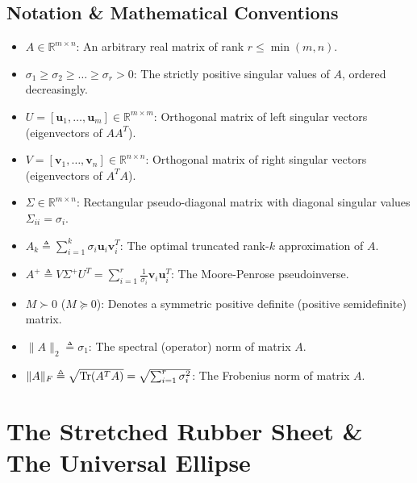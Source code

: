 \subsection{Notation \& Mathematical Conventions}
\begin{itemize}
    \item $A \in \mathbb{R}^{m \times n}$: An arbitrary real matrix of rank $r \le \min(m, n)$.
    \item $\sigma_1 \ge \sigma_2 \ge \dots \ge \sigma_r > 0$: The strictly positive singular values of $A$, ordered decreasingly.
    \item $U = [\mathbf{u}_1, \dots, \mathbf{u}_m] \in \mathbb{R}^{m \times m}$: Orthogonal matrix of left singular vectors (eigenvectors of $A A^T$).
    \item $V = [\mathbf{v}_1, \dots, \mathbf{v}_n] \in \mathbb{R}^{n \times n}$: Orthogonal matrix of right singular vectors (eigenvectors of $A^T A$).
    \item $\Sigma \in \mathbb{R}^{m \times n}$: Rectangular pseudo-diagonal matrix with diagonal singular values $\Sigma_{ii} = \sigma_i$.
    \item $A_k \triangleq \sum_{i=1}^k \sigma_i \mathbf{u}_i \mathbf{v}_i^T$: The optimal truncated rank-$k$ approximation of $A$.
    \item $A^+ \triangleq V \Sigma^+ U^T = \sum_{i=1}^r \frac{1}{\sigma_i} \mathbf{v}_i \mathbf{u}_i^T$: The Moore-Penrose pseudoinverse.
    \item $M \succ 0$ ($M \succeq 0$): Denotes a symmetric positive definite (positive semidefinite) matrix.
    \item $\|A\|_2 \triangleq \sigma_1$: The spectral (operator) norm of matrix $A$.
    \item $\|A\|_F \triangleq \sqrt{\operatorname{Tr}(A^T A)} = \sqrt{\sum_{i=1}^r \sigma_i^2}$: The Frobenius norm of matrix $A$.
\end{itemize}

\section{The Stretched Rubber Sheet \& The Universal Ellipse}

